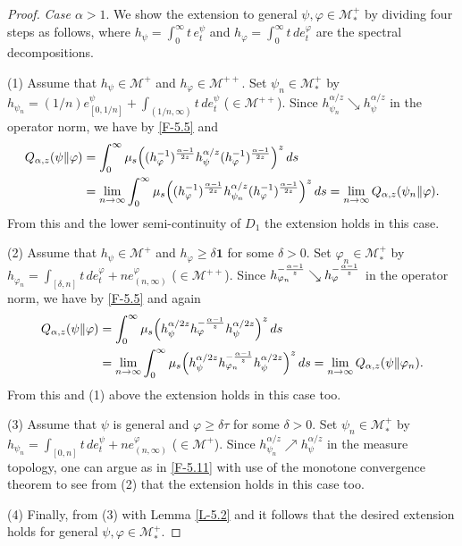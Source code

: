 \documentclass[12pt]{article}
\theoremstyle{definition}
\theoremstyle{remark}
\numberwithin{equation}{section}
\def\Me{\mathcal M}
\def\ffi{\varphi}
\def\1{\mathbf{1}}
\begin{document}
\begin{proof}
{\it Case $\alpha>1$}.\enspace
We show the extension to general $\psi,\ffi\in\Me_*^+$ by dividing four steps as follows, where
$h_\psi=\int_0^\infty t\,e_t^\psi$ and $h_\ffi=\int_0^\infty t\,de_t^\ffi$ are the spectral decompositions.

(1)\enspace
Assume that $h_\psi\in\Me^+$ and $h_\ffi\in\Me^{++}$. Set $\psi_n\in\Me_*^+$ by
$h_{\psi_n}=(1/n)e_{[0,1/n]}^\psi+\int_{(1/n,\infty)}t\,de_t^\psi$ ($\in\Me^{++}$). Since
$h_{\psi_n}^{\alpha/z}\searrow h_\psi^{\alpha/z}$ in the operator norm, we have by \eqref{F-5.5} and
\cite[Lemma 3.4]{fack1986generalized}
\begin{align}
Q_{\alpha,z}(\psi\|\ffi)&=\int_0^\infty\mu_s\Bigl((h_\ffi^{-1})^{\alpha-1\over2z}h_\psi^{\alpha/z}
(h_\ffi^{-1})^{\alpha-1\over2z}\Bigr)^z\,ds \nonumber\\
&=\lim_{n\to\infty}\int_0^\infty\mu_s\Bigl((h_\ffi^{-1})^{\alpha-1\over2z}h_{\psi_n}^{\alpha/z}
(h_\ffi^{-1})^{\alpha-1\over2z}\Bigr)^z\,ds
=\lim_{n\to\infty}Q_{\alpha,z}(\psi_n\|\ffi). \label{F-5.11}
\end{align}
From this and the lower semi-continuity of $D_1$ the extension holds in this case.

(2)\enspace
Assume that $h_\psi\in\Me^+$ and $h_\ffi\ge\delta\1$ for some $\delta>0$. Set $\ffi_n\in\Me_*^+$
by $h_{\ffi_n}=\int_{[\delta,n]}t\,de_t^\ffi+ne_{(n,\infty)}^\ffi$ ($\in\Me^{++}$). Since
$h_{\ffi_n}^{-{\alpha-1\over z}}\searrow h_\ffi^{-{\alpha-1\over z}}$ in the operator norm, we have by
\eqref{F-5.5} and \cite[Lemma 3.4]{fack1986generalized} again
\begin{align*}
Q_{\alpha,z}(\psi\|\ffi)&=\int_0^\infty\mu_s\Bigl(h_\psi^{\alpha/2z}h_\ffi^{-{\alpha-1\over z}}
h_\psi^{\alpha/2z}\Bigr)^z\,ds \\
&=\lim_{n\to\infty}\int_0^\infty\mu_s\Bigl(h_\psi^{\alpha/2z}h_{\ffi_n}^{-{\alpha-1\over z}}
h_\psi^{\alpha/2z}\Bigr)^z\,ds
=\lim_{n\to\infty}Q_{\alpha,z}(\psi\|\ffi_n).
\end{align*}
From this and (1) above the extension holds in this case too.

(3)\enspace
Assume that $\psi$ is general and $\ffi\ge\delta\tau$ for some $\delta>0$. Set $\psi_n\in\Me_*^+$
by $h_{\psi_n}=\int_{[0,n]}t\,de_t^\psi+ne_{(n,\infty)}^\ffi$ ($\in\Me^+$). Since
$h_{\psi_n}^{\alpha/z}\nearrow h_\psi^{\alpha/z}$ in the measure topology, one can argue as in \eqref{F-5.11}
with use of the monotone convergence theorem to see from (2) that the extension holds in this case too.

(4)\enspace
Finally, from (3) with Lemma \ref{L-5.2} and \cite[Corollary 2.8(3)]{hiai2021quantum} it follows that
the desired extension {\color{red}holds} for general $\psi,\ffi\in\Me_*^+$.
\end{proof}
\end{document}

